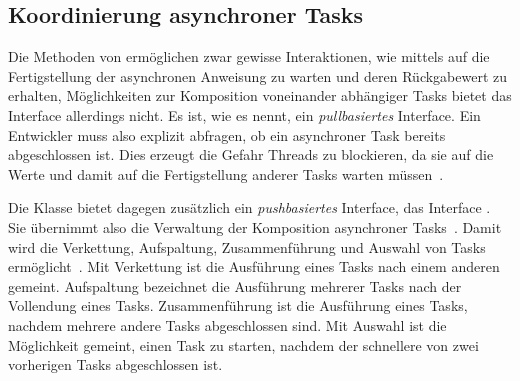 \subsection{Koordinierung asynchroner Tasks}

Die Methoden von  ermöglichen zwar gewisse Interaktionen, wie mittels  auf die Fertigstellung der asynchronen Anweisung zu warten und deren Rückgabewert zu erhalten, Möglichkeiten zur Komposition voneinander abhängiger Tasks bietet das Interface allerdings nicht. Es ist, wie \textcite[S.~240]{Hettel2016} es nennt, ein \emph{pullbasiertes} Interface. Ein Entwickler muss also explizit abfragen, ob ein asynchroner Task bereits abgeschlossen ist. Dies erzeugt die Gefahr Threads zu blockieren, da sie auf die Werte und damit auf die Fertigstellung anderer Tasks warten müssen~\cite[S.~239]{Hettel2016}.

Die Klasse  bietet dagegen zusätzlich ein \emph{pushbasiertes} Interface, das Interface . Sie übernimmt also die Verwaltung der Komposition asynchroner Tasks~\cite[S.~240~ff.]{Hettel2016}. Damit wird die Verkettung, Aufspaltung, Zusammenführung und Auswahl von Tasks ermöglicht~\cite[S.~250~ff.]{Hettel2016}. Mit Verkettung ist die Ausführung eines Tasks nach einem anderen gemeint. Aufspaltung bezeichnet die Ausführung mehrerer Tasks nach der Vollendung eines Tasks. Zusammenführung ist die Ausführung eines Tasks, nachdem mehrere andere Tasks abgeschlossen sind. Mit Auswahl ist die Möglichkeit gemeint, einen Task zu starten, nachdem der schnellere von zwei vorherigen Tasks abgeschlossen ist.
